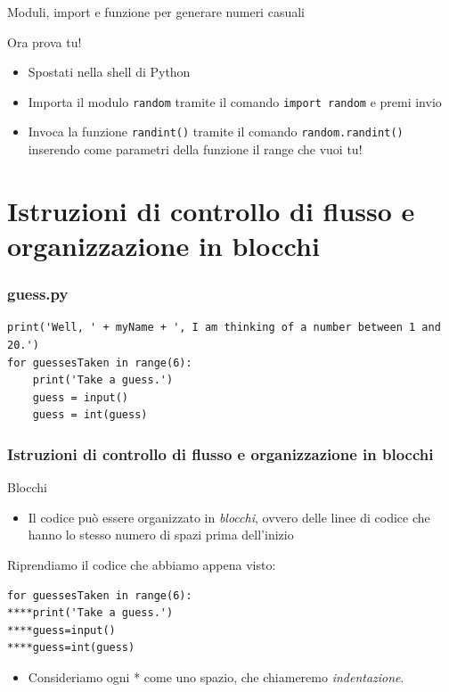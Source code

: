\documentclass{beamer}
\begin{document}
\begin{frame}{Moduli, import e funzione per generare numeri casuali}
    \begin{block}{Ora prova tu!}
        \begin{itemize}
            \item Spostati nella shell di Python
            \item Importa il modulo \texttt{random} tramite il comando \texttt{import random} e premi invio
            \item Invoca la funzione \texttt{randint()} tramite il comando \texttt{random.randint()} inserendo come parametri della funzione il range che vuoi tu!
        \end{itemize}
        
    \end{block}
\end{frame}

\section{Istruzioni di controllo di flusso e organizzazione in blocchi}

\begin{frame}[fragile]
\frametitle{guess.py}
\begin{lstlisting}
print('Well, ' + myName + ', I am thinking of a number between 1 and 20.')
for guessesTaken in range(6):
    print('Take a guess.')
    guess = input()
    guess = int(guess)
\end{lstlisting}
\end{frame}

\begin{frame}[fragile]
\frametitle{Istruzioni di controllo di flusso e organizzazione in blocchi}
    \begin{block}{Blocchi}
    \begin{itemize}
        \item Il codice può essere organizzato in \textit{blocchi}, ovvero delle linee di codice che hanno lo stesso numero di spazi prima dell'inizio
    \end{itemize}
        Riprendiamo il codice che abbiamo appena visto:
\begin{lstlisting}
for guessesTaken in range(6):
****print('Take a guess.')
****guess=input()
****guess=int(guess)
\end{lstlisting}
	\begin{itemize}
	\item Consideriamo ogni * come uno spazio, che chiameremo \textit{indentazione}.
	\end{itemize}
    \end{block}
\end{frame}
\end{document}
